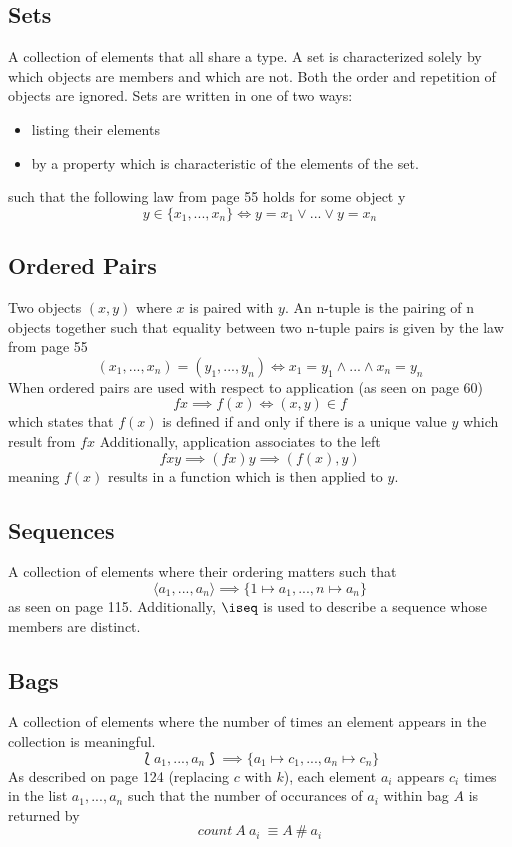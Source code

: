 \documentclass[../main.tex]{subfiles}
\begin{document}
\subsection{Sets}
A collection of elements that all share a type. A set is characterized solely by which objects are members and which are not.
Both the order and repetition of objects are ignored. Sets are written in one of two ways:
\begin{itemize}
\item listing their elements
\item by a property which is characteristic of the elements of the set.
\end{itemize}
such that the following law from page 55 holds for some object y
$$y \in \{x_{1},...,x_{n}\} \iff y = x_{1} \lor ... \lor y = x_{n}$$

\subsection{Ordered Pairs}
Two objects $(x, y)$ where $x$ is paired with $y$. An n-tuple is
the pairing of n objects together such that equality between two n-tuple pairs
is given by the law from page 55
$$(x_{1},...,x_{n}) = (y_{1},...,y_{n}) \iff x_{1} = y_{1} \land ... \land x_{n} = y_{n}$$
When ordered pairs are used with respect to application (as seen on page 60)
$$f x \implies f(x) \iff (x,y) \in f$$
which states that $f(x)$ is defined if and only if there is a unique value $y$ which result from $f x$
Additionally, application associates to the left
$$f x y \implies (f x) y \implies (f(x), y)$$
meaning $f(x)$ results in a function which is then applied to $y$.

\subsection{Sequences}
A collection of elements where their ordering matters such that
$$\langle a_{1},...,a_{n} \rangle \implies \{1 \mapsto a_{1}, ..., n \mapsto a_{n}\}$$
as seen on page 115. Additionally, $\iseq$ is used to describe a sequence whose members are distinct.

\subsection{Bags}
A collection of elements where the number of times an element appears in the collection is meaningful.
$$\lbag a_{1},...,a_{n} \rbag \implies \{a_{1} \mapsto c_{1},...,a_{n} \mapsto c_{n}\}$$
As described on page 124 (replacing $c$ with $k$), each element $a_{i}$ appears $c_{i}$ times in the list $a_{1},...,a_{n}$
such that the number of occurances of $a_{i}$ within bag $A$ is returned by
$$count ~A ~a_{i} \ \equiv A ~\# ~a_{i}$$
\end{document}
